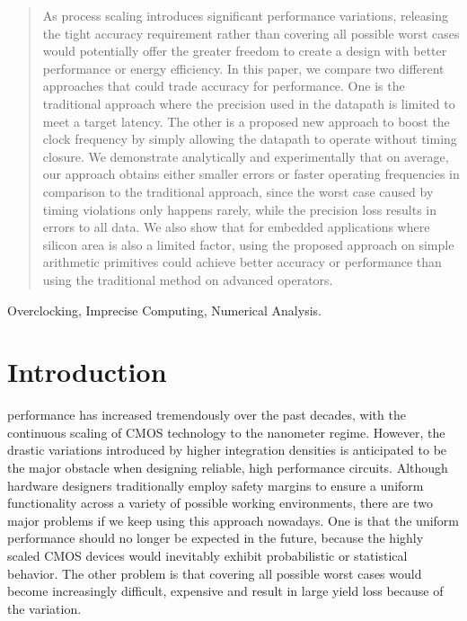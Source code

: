 \documentclass[journal]{IEEEtran}
\begin{document}
\begin{abstract}
As process scaling introduces significant performance variations, releasing the tight accuracy requirement rather than covering all possible worst cases would potentially offer the greater freedom to create a design with better performance or energy efficiency. In this paper, we compare two different approaches that could trade accuracy for performance. One is the traditional approach where the precision used in the datapath is limited to meet a target latency. The other is a proposed new approach to boost the clock frequency by simply allowing the datapath to operate without timing closure. We demonstrate analytically and experimentally that on average, our approach obtains either smaller errors or faster operating frequencies in comparison to the traditional approach, since the worst case caused by timing violations only happens rarely, while the precision loss results in errors to all data. We also show that for embedded applications where silicon area is also a limited factor, using the proposed approach on simple arithmetic primitives could achieve better accuracy or performance than using the traditional method on advanced operators.
\end{abstract}

\begin{IEEEkeywords}
Overclocking, Imprecise Computing, Numerical Analysis.
\end{IEEEkeywords}


%
\IEEEpeerreviewmaketitle



\section{Introduction}
 performance has increased tremendously over the past decades, with the continuous scaling of CMOS technology to the nanometer regime. However, the drastic variations introduced by higher integration densities is anticipated to be the major obstacle when designing reliable, high performance circuits. Although hardware designers traditionally employ safety margins to ensure a uniform functionality across a variety of possible working environments, there are two major problems if we keep using this approach nowadays. One is that the uniform performance should no longer be expected in the future, because the highly scaled CMOS devices would inevitably exhibit probabilistic or statistical behavior. The other problem is that covering all possible worst cases would become increasingly difficult, expensive and result in large yield loss because of the variation.
\end{document}
